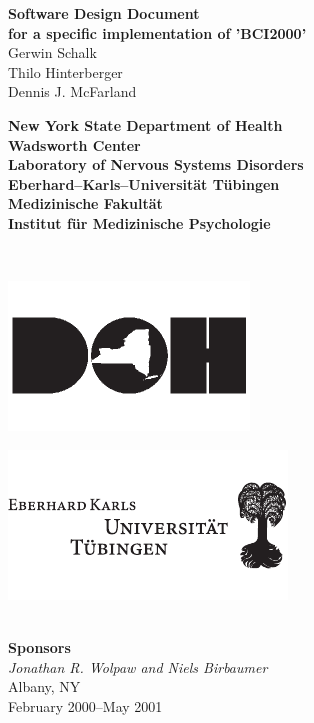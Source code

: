 \begin{titlepage}
\hspace{-7mm}
\begin{minipage}{\textwidth}
\begin{center}
\vspace{.5cm}
{\huge \bf Software Design Document\\[1.5ex]}
{\large \bf for a specific implementation of 'BCI2000'}
\\[1.5cm]
{\Large Gerwin Schalk\\}
{\Large Thilo Hinterberger\\}
{\Large Dennis J. McFarland\\[1.5cm]}
%
\begin{minipage}{13cm}
  \begin{minipage}[c]{13cm}
    \begin{center}
      {\Large \bf New York State Department of Health\\[2ex]}
      {\large \bf Wadsworth Center\\[0.5ex]
       Laboratory of Nervous Systems Disorders\\[4ex]}
      {\Large \bf Eberhard--Karls--Universit\"at T\"ubingen\\[2ex]}
      {\large \bf Medizinische Fakult\"at\\[0.5ex]
       Institut f\"ur Medizinische Psychologie\\[0.5ex]}
    \end{center}
  \end{minipage}
  \\[1.0cm]
  \begin{minipage}[c]{6cm}
    \centerline{\includegraphics{figures/DOHlogo}}
  \end{minipage}
  \hspace{1.5cm}
  \begin{minipage}[c]{3cm}
    \centerline{\includegraphics{figures/EKUlogo}}
  \end{minipage}
\end{minipage}
%
\\[2.0cm]
\textbf{Sponsors} \\
\textit{Jonathan R. Wolpaw and Niels Birbaumer}
\\[1.5cm]
{Albany, NY} \\[1ex]
{February 2000--May 2001}
\end{center}
\end{minipage}
\end{titlepage}
